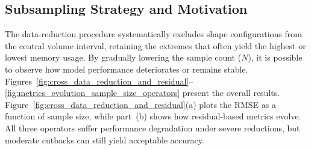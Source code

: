 
\subsection{Subsampling Strategy and Motivation}
\label{subsec:data-reduction-strategy-and-motivation}

The data-reduction procedure systematically excludes shape configurations from the central volume interval, retaining the extremes that often yield the highest or lowest memory usage.
By gradually lowering the sample count (\(N\)), it is possible to observe how model performance deteriorates or remains stable.
Figures~\ref{fig:cross_data_reduction_and_residual}--\ref{fig:metrics_evolution_sample_size_operators} present the overall results.
Figure~\ref{fig:cross_data_reduction_and_residual}(a) plots the \ac{RMSE} as a function of sample size, while part~(b) shows how residual-based metrics evolve.
All three operators suffer performance degradation under severe reductions, but moderate cutbacks can still yield acceptable accuracy.

